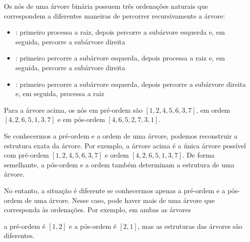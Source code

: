 Os nós de uma árvore binária possuem três ordenações naturais que correspondem a diferentes maneiras de percorrer recursivamente a árvore:

\begin{itemize}
\item {}: primeiro processa a raiz, depois percorre a subárvore esquerda e, em seguida, percorre a subárvore direita
\item {}: primeiro percorre a subárvore esquerda, depois processa a raiz e, em seguida, percorre a subárvore direita
\item {}: primeiro percorre a subárvore esquerda, depois percorre a subárvore direita e, em seguida, processa a raiz
\end{itemize}

Para a árvore acima, os nós em pré-ordem são $[1,2,4,5,6,3,7]$, em ordem $[4,2,6,5,1,3,7]$ e em pós-ordem $[4,6,5,2,7,3,1]$.

Se conhecermos a pré-ordem e a ordem de uma árvore, podemos reconstruir a estrutura exata da árvore. Por exemplo, a árvore acima é a única árvore possível com pré-ordem $[1,2,4,5,6,3,7]$ e ordem $[4,2,6,5,1,3,7]$. De forma semelhante, a pós-ordem e a ordem também determinam a estrutura de uma árvore.

No entanto, a situação é diferente se conhecermos apenas a pré-ordem e a pós-ordem de uma árvore. Nesse caso, pode haver mais de uma árvore que corresponda às ordenações. Por exemplo, em ambas as árvores
\begin{center}
\end{center}
a pré-ordem é $[1,2]$ e a pós-ordem é $[2,1]$, mas as estruturas das árvores são diferentes.
